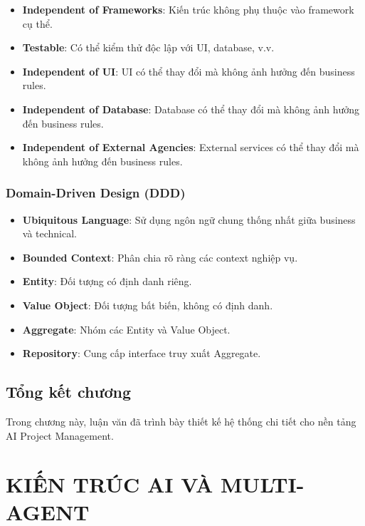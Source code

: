 \documentclass[12pt,a4paper]{report}
\begin{document}
\begin{itemize}
\item \textbf{Independent of Frameworks}: Kiến trúc không phụ thuộc vào framework cụ thể.
\item \textbf{Testable}: Có thể kiểm thử độc lập với UI, database, v.v.
\item \textbf{Independent of UI}: UI có thể thay đổi mà không ảnh hưởng đến business rules.
\item \textbf{Independent of Database}: Database có thể thay đổi mà không ảnh hưởng đến business rules.
\item \textbf{Independent of External Agencies}: External services có thể thay đổi mà không ảnh hưởng đến business rules.
\end{itemize}

\subsection{Domain-Driven Design (DDD)}

\begin{itemize}
\item \textbf{Ubiquitous Language}: Sử dụng ngôn ngữ chung thống nhất giữa business và technical.
\item \textbf{Bounded Context}: Phân chia rõ ràng các context nghiệp vụ.
\item \textbf{Entity}: Đối tượng có định danh riêng.
\item \textbf{Value Object}: Đối tượng bất biến, không có định danh.
\item \textbf{Aggregate}: Nhóm các Entity và Value Object.
\item \textbf{Repository}: Cung cấp interface truy xuất Aggregate.
\end{itemize}

\section{Tổng kết chương}


Trong chương này, luận văn đã trình bày thiết kế hệ thống chi tiết cho nền tảng AI Project Management.

\chapter{KIẾN TRÚC AI VÀ MULTI-AGENT}
\label{chap:ai_architecture}
\end{document}
